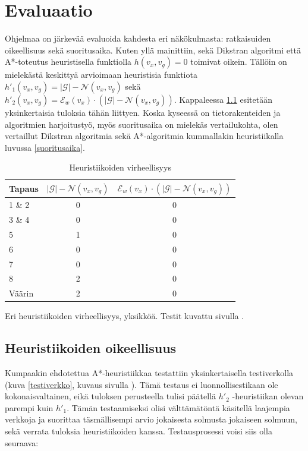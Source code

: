 \documentclass[10pt,a4paper]{article}
\begin{document}
\section{Evaluaatio}

Ohjelmaa on järkevää evaluoida kahdesta eri näkökulmasta: ratkaisuiden oikeellisuus sekä suoritusaika. Kuten yllä mainittiin, sekä Dikstran algoritmi että A*-toteutus heuristisella funktiolla $h(v_x,v_g) = 0$ toimivat oikein. Tällöin on mielekästä keskittyä arvioimaan heuristisia funktiota $h'_1( v_x, v_g ) = |\mathcal{G}| - \mathcal{N}( v_x , v_g )$ sekä $ h'_2( v_x, v_g ) = \mathcal{E}_w ( v_x ) \cdot ( |\mathcal{G}| - \mathcal{N}( v_x , v_g ) ) $. Kappaleessa \ref{heuristic_correctness} esitetään yksinkertaisia tuloksia tähän liittyen. Koska kyseessä on tietorakenteiden ja algoritmien harjoitustyö, myös suoritusaika on mielekäs vertailukohta, olen vertaillut Dikstran algoritmia sekä A*-algoritmia kummallakin heuristiikalla luvussa \ref{suoritusaika}.

\begin{table}
\begin{tabular}{l|c|c }
Tapaus & $ |\mathcal{G}| - \mathcal{N}( v_x , v_g )$  & $ \mathcal{E}_w ( v_x ) \cdot ( |\mathcal{G}| - \mathcal{N}( v_x , v_g ) ) $ \\ 
\hline 
1 \& 2 & 0 & 0 \\ 
3 \& 4 & 0 & 0 \\  
5 & 1 & 0 \\
6 & 0 & 0 \\
7 & 0 & 0 \\
8 & 2 & 0 \\
\hline
Väärin & 2 & 0 \\
\hline 
\end{tabular} 
\caption{Heuristiikoiden virheellisyys}
Eri heuristiikoiden virheellisyys, yksikköä. Testit kuvattu sivulla \pageref{network_test}.
\label{heuristic_correct}
\end{table}

\subsection{Heuristiikoiden oikeellisuus}
\label{heuristic_correctness}

Kumpaakin ehdotettua A*-heuristiikkaa testattiin yksinkertaisella testiverkolla (kuva \ref{testiverkko}, kuvaus sivulla \pageref{network_test}). Tämä testaus ei luonnollisestikaan ole kokonaisvaltainen, eikä tuloksen perusteella tulisi päätellä $h'_2$ -heuristiikan olevan parempi kuin $h'_1$. Tämän testaamiseksi olisi välttämätöntä käsitellä laajempia verkkoja ja suorittaa täsmällisempi arvio jokaisesta solmusta jokaiseen solmuun, sekä verrata tuloksia heuristiikoiden kanssa. Testausprosessi voisi siis olla seuraava:
\end{document}
